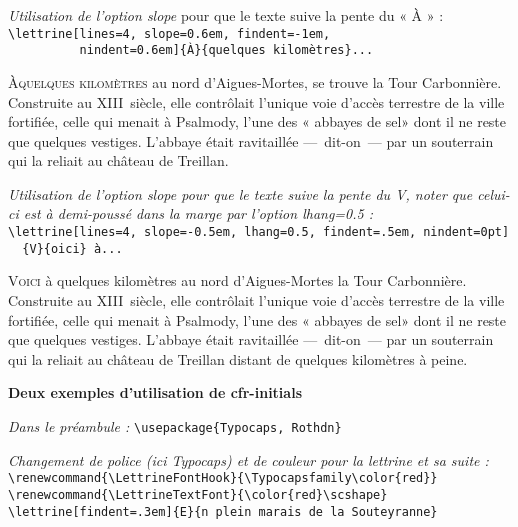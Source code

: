 \documentclass[paper=a4,12pt,german,french]{scrartcl}
\begin{document}
\vspace{.5\baselineskip}
\textit{Utilisation de l'option {\ttfamily\upshape slope}} pour que le texte
suive la pente du « À » :\\
\verb+\lettrine[lines=4, slope=0.6em, findent=-1em,+\\
\verb+          nindent=0.6em]{À}{quelques kilomètres}...+

\lettrine[lines=4, slope=0.6em, findent=-1em, nindent=0.6em]{À} {quelques
kilomètres} au nord d'Aigues-Mortes, se trouve  la Tour Carbonnière.
Construite au XIII\ieme~siècle, elle contrôlait l'unique voie d'accès
terrestre de la ville fortifiée, celle qui menait à Psalmody,
l'une des « abbayes de sel» dont il ne reste que quelques vestiges.
L'abbaye était ravitaillée ---~dit-on~--- par un souterrain qui
la reliait au château de Treillan.

\vspace{.5\baselineskip}
\textit{Utilisation de l'option {\ttfamily\upshape slope} pour que le texte
 suive la pente du {\ttfamily\upshape V}, noter que celui-ci est à
 demi-poussé dans la marge par l'option {\ttfamily\upshape lhang=0.5} :}\\
\verb+\lettrine[lines=4, slope=-0.5em, lhang=0.5, findent=.5em, nindent=0pt]+\\
\verb+  {V}{oici} à...+

\lettrine[lines=4, slope=-0.5em, lhang=0.5, findent=.5em, nindent=0pt]{V}{oici}
à quelques kilomètres au nord d'Aigues-Mortes la Tour Carbonnière.
Construite au XIII\ieme~siècle, elle contrôlait l'unique voie d'accès
terrestre de la ville fortifiée, celle qui menait à Psalmody,
l'une des « abbayes de sel» dont il ne reste que quelques vestiges.
L'abbaye était ravitaillée ---~dit-on~--- par un souterrain qui
la reliait au château de Treillan distant de quelques kilomètres à peine.

\newpage

\begin{center}
\large\bfseries Deux exemples d’utilisation de cfr-initials
\end{center}

\textit{Dans le préambule :}
\verb+\usepackage{Typocaps, Rothdn}+

\vspace{.5\baselineskip}
\textit{Changement de police (ici Typocaps)
  et de couleur pour la lettrine et sa suite :}\\
\verb+\renewcommand{\LettrineFontHook}{\Typocapsfamily\color{red}}+\\
\verb+\renewcommand{\LettrineTextFont}{\color{red}\scshape}+\\
\verb+\lettrine[findent=.3em]{E}{n plein marais de la Souteyranne}+
\end{document}
